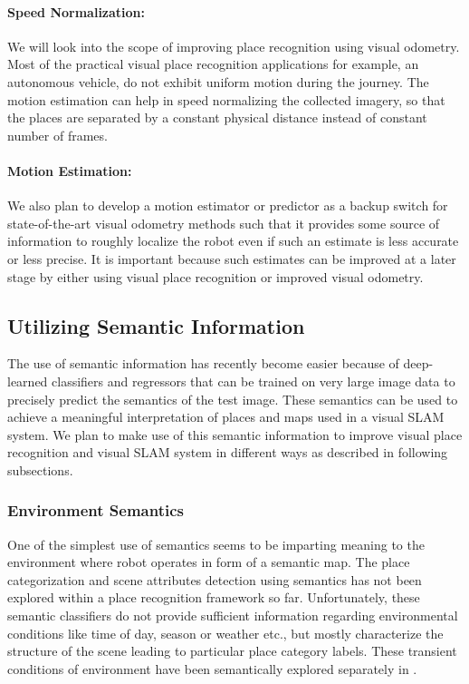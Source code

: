 \documentclass{article}
\begin{document}
\paragraph{Speed Normalization:}We will look into the scope of improving place recognition using visual odometry. Most of the practical visual place recognition applications for example, an autonomous vehicle, do not exhibit uniform motion during the journey. The motion estimation can help in speed normalizing the collected imagery, so that the places are separated by a constant physical distance instead of constant number of frames.

\paragraph{Motion Estimation:}We also plan to develop a motion estimator or predictor as a backup switch for state-of-the-art visual odometry methods such that it provides some source of information to roughly localize the robot even if such an estimate is less accurate or less precise. It is important because such estimates can be improved at a later stage by either using visual place recognition or improved visual odometry.


\subsection{Utilizing Semantic Information}
The use of semantic information has recently become easier because of deep-learned classifiers and regressors \cite{girshick2014rich,zhou2014learning} that can be trained on very large image data to precisely predict the semantics of the test image. These semantics can be used to achieve a meaningful interpretation of places and maps used in a visual SLAM system. We plan to make use of this semantic information to improve visual place recognition and visual SLAM system in different ways as described in following subsections.

\subsubsection{Environment Semantics}
One of the simplest use of semantics seems to be imparting meaning to the environment where robot operates in form of a semantic map. The place categorization \cite{zhou2014learning} and scene attributes detection \cite{Patterson2012SunAttributes} using semantics has not been explored within a place recognition framework so far. Unfortunately, these semantic classifiers do not provide sufficient information regarding environmental conditions like time of day, season or weather etc., but mostly characterize the structure of the scene leading to particular place category labels. These transient conditions of environment have been semantically explored separately in \cite{laffont2014transient}. 
\end{document}
